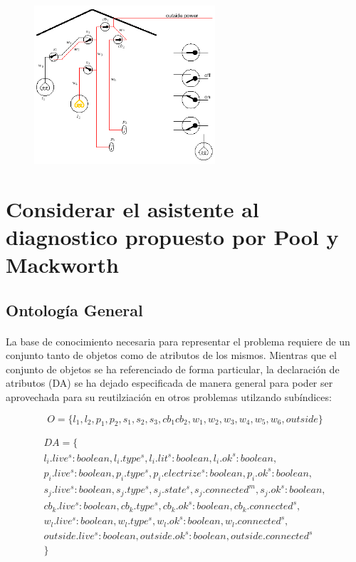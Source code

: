 \documentclass[10pt, a4paper,spanish]{article}
\begin{document}
	\begin{figure}[H]
		\begin{center}
			\includegraphics[width=0.6\textwidth]{diagnostic-assistant}
		\end{center}
	\end{figure}

	\section{Considerar el asistente al diagnostico propuesto por Pool y Mackworth}

		\subsection{Ontología General}

			\paragraph{}
			La base de conocimiento necesaria para representar el problema requiere de un conjunto tanto de objetos como de atributos de los mismos. Mientras que el conjunto de objetos se ha referenciado de forma particular, la declaración de atributos (DA) se ha dejado especificada de manera general para poder ser aprovechada para su reutilziación en otros problemas utilzando subíndices:

			\begin{equation*}
				O = \{l_1, l_2, p_1, p_2, s_1, s_2, s_3, cb_1 cb_2, w_1, w_2, w_3, w_4, w_5, w_6, outside\}
			\end{equation*}

			\begin{multline*}
				DA = \{ \\
					l_i.live^s:boolean, l_i.type^s, l_i.lit^s:boolean, l_i.ok^s:boolean, \\
					p_i.live^s:boolean, p_i.type^s, p_i.electrize^s:boolean, p_i.ok^s:boolean, \\
					s_j.live^s:boolean, s_j.type^s, s_j.state^s, s_j.connected^m, s_j.ok^s:boolean, \\
					cb_k.live^s:boolean, cb_k.type^s, cb_k.ok^s:boolean, cb_k.connected^s, \\
					w_l.live^s:boolean, w_l.type^s, w_l.ok^s:boolean, w_l.connected^s, \\
					outside.live^s:boolean, outside.ok^s:boolean, outside.connected^s \\
				\}
			\end{multline*}
\end{document}
